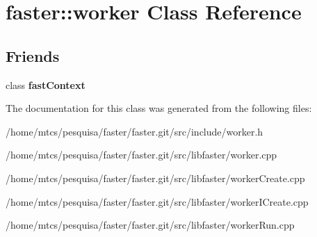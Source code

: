 \hypertarget{classfaster_1_1worker}{}\section{faster\+:\+:worker Class Reference}
\label{classfaster_1_1worker}
\subsection*{Friends}
\begin{DoxyCompactItemize}
\item 
\hypertarget{classfaster_1_1worker_a8ffe9636e25b4912700710d5fd2b5a2a}{}class {\bfseries fast\+Context}\label{classfaster_1_1worker_a8ffe9636e25b4912700710d5fd2b5a2a}

\end{DoxyCompactItemize}


The documentation for this class was generated from the following files\+:\begin{DoxyCompactItemize}
\item 
/home/mtcs/pesquisa/faster/faster.\+git/src/include/worker.\+h\item 
/home/mtcs/pesquisa/faster/faster.\+git/src/libfaster/worker.\+cpp\item 
/home/mtcs/pesquisa/faster/faster.\+git/src/libfaster/worker\+Create.\+cpp\item 
/home/mtcs/pesquisa/faster/faster.\+git/src/libfaster/worker\+I\+Create.\+cpp\item 
/home/mtcs/pesquisa/faster/faster.\+git/src/libfaster/worker\+Run.\+cpp\end{DoxyCompactItemize}
